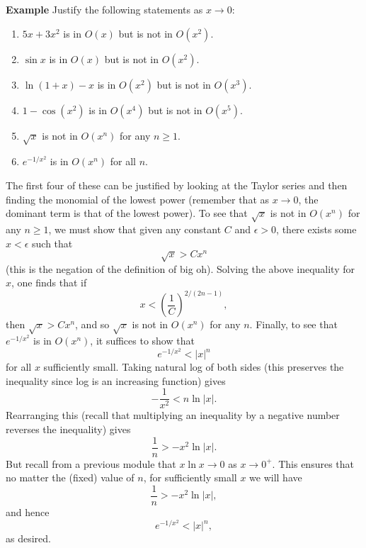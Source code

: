 \documentclass[twoside,openright,titlepage,a4paper]{book}
\begin{document}
\begin{sloppypar}
\textbf{Example} Justify the following statements as $x \rightarrow 0$:
\begin{enumerate}
	\item $5x+3x^2$ is in $O(x)$ but is not in $O(x^2)$.
	\item $\sin x$ is in $O(x)$ but is not in $O(x^2)$.
	\item $\ln(1+x)-x$ is in $O(x^2)$ but is not in $O(x^3)$.
	\item $1 - \cos(x^2)$ is in $O(x^4)$ but is not in $O(x^5)$.
	\item $\sqrt{x}$ is not in $O(x^n)$ for any $n \geq 1$.
	\item $e^{-1/x^2}$ is in $O(x^n)$ for all $n$.
\end{enumerate}
\begin{examplebox}
The first four of these can be justified by looking at the Taylor series and then finding the monomial of the lowest power (remember that as $x \rightarrow 0$, the dominant term is that of the lowest power).
To see that $\sqrt{x}$ is not in $O(x^n)$ for any $n \geq 1$, we must show that given any constant $C$ and $\epsilon>0$, there exists some $x < \epsilon$ such that \[ \sqrt{x} > C x^n \] (this is the negation of the definition of big oh). Solving the above inequality for $x$, one finds that if \[ x < \left(\frac{1}{C}\right)^{2/(2n-1)}, \] then $\sqrt{x} > C x^n$, and so $\sqrt{x}$ is not in $O(x^n)$ for any $n$.
Finally, to see that $e^{-1/x^2}$ is in $O(x^n)$, it suffices to show that \[ e^{-1/x^2} < |x|^n \] for all $x$ sufficiently small. Taking natural log of both sides (this preserves the inequality since log is an increasing function) gives \[ -\frac{1}{x^2} < n \ln|x|. \]
Rearranging this (recall that multiplying an inequality by a negative number reverses the inequality) gives \[ \frac{1}{n} > -x^2 \ln |x|. \]
But recall from a previous module that $ x \ln x \rightarrow 0$ as $x \rightarrow 0^+$. This ensures that no matter the (fixed) value of $n$, for sufficiently small $x$ we will have \[ \frac{1}{n} > -x^2 \ln |x|, \] and hence \[ e^{-1/x^2} < |x|^n, \] as desired.
\end{examplebox}


\end{sloppypar}
\end{document}
